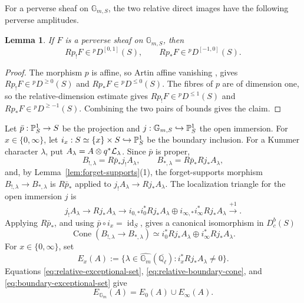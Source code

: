 \documentclass[12pt,reqno]{amsart}
\theoremstyle{definition}
\theoremstyle{plain}
\newtheorem{lem}[para]{Lemma}
\theoremstyle{definition}
\theoremstyle{remark}
\newcommand{\bbG}{\mathbb{G}}  \newcommand{\bbH}{\mathbb{H}}
\newcommand{\bbQ}{\mathbb{Q}}  \newcommand{\bbR}{\mathbb{R}}
\newcommand{\ol}[1]{\overline{#1}}
\newcommand{\Ql}{\bbQ_{\ell}}
\newcommand{\Db}{D^b_c}
\newcommand{\Gm}{\bbG_m}
\newcommand{\Cone}{\operatorname{Cone}}
\begin{document}
For a perverse sheaf on \(\bbG_{m,S}\), the two relative direct images have the following perverse
amplitudes.

\begin{lem}
\label{lem:relative-amplitude}
If \(F\) is a perverse sheaf on \(\bbG_{m,S}\), then
\[
        Rp_!F\in{}^pD^{[0,1]}(S),
        \qquad
        Rp_*F\in{}^pD^{[-1,0]}(S).
\]
\end{lem}

\begin{proof}
The morphism \(p\) is affine, so Artin affine vanishing \cite[Th.~4.1.1, Cor.~4.1.2]{BBDG18},
\cite[Exp.~XIV, 3.1]{SGA4} gives \(Rp_!F\in{}^pD^{\ge0}(S)\) and \(Rp_*F\in{}^pD^{\le0}(S)\).  The
fibres of \(p\) are of dimension one, so the relative-dimension estimate \cite[4.2.4]{BBDG18} gives
\(Rp_!F\in{}^pD^{\le1}(S)\) and \(Rp_*F\in{}^pD^{\ge-1}(S)\).  Combining the two pairs of bounds
gives the claim.
\end{proof}

Let \(\bar p:\mathbb{P}^1_S\to S\) be the projection and
\(j:\bbG_{m,S}\hookrightarrow\bbP^1_S\) the open immersion.  For
\(x\in\{0,\infty\}\), let
\(i_x:S\simeq\{x\}\times S\hookrightarrow\mathbb{P}^1_S\) be the boundary inclusion.  For a
Kummer character \(\lambda\), put
\(A_\lambda=A\otimes q^*\mathcal{L}_\lambda\).  Since \(\bar p\) is proper,
\[
        B_{!,\lambda}=R\bar p_*j_!A_\lambda,
        \qquad
        B_{*,\lambda}=R\bar p_*Rj_*A_\lambda ,
\]
and, by Lemma~\ref{lem:forget-supports}(1), the forget-supports morphism \(B_{!,\lambda}\to B_{*,\lambda}\) is
\(R\bar p_*\) applied to \(j_!A_\lambda\to Rj_*A_\lambda\).
The localization triangle for the open immersion \(j\) is
\[
        j_!A_\lambda\longrightarrow Rj_*A_\lambda
        \longrightarrow
        i_{0,*}i_0^*Rj_*A_\lambda\oplus i_{\infty,*}i_\infty^*Rj_*A_\lambda
        \xrightarrow{+1}.
\]
Applying \(R\bar p_*\), and using \(\bar p\circ i_x=\operatorname{id}_S\), gives a canonical
isomorphism in \(\Db(S)\)
\begin{equation}
\label{eq:relative-boundary-cone}
        \Cone(B_{!,\lambda}\to B_{*,\lambda})
        \simeq
        i_0^*Rj_*A_\lambda\oplus i_\infty^*Rj_*A_\lambda .
\end{equation}
For \(x\in\{0,\infty\}\), set
\begin{equation}
\label{eq:boundary-exceptional-set}
        E_x(A):=
        \{\lambda\in\widehat{\Gm}(\ol\Ql):i_x^*Rj_*A_\lambda\neq0\}.
\end{equation}
Equations \eqref{eq:relative-exceptional-set}, \eqref{eq:relative-boundary-cone}, and
\eqref{eq:boundary-exceptional-set} give
\[
        E_{\Gm}(A)=E_0(A)\cup E_\infty(A).
\]
\end{document}

